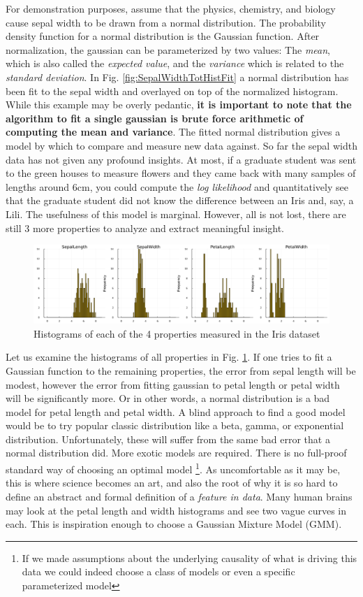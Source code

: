 For demonstration purposes, assume that the physics, chemistry, and biology cause sepal width to be drawn from a normal distribution. The probability density function for a normal distribution is the Gaussian function. After normalization, the gaussian can be parameterized by two values: The \emph{mean}, which is also called the \emph{expected value}, and the \emph{variance} which is related to the \emph{standard deviation}. In Fig. \ref{fig:SepalWidthTotHistFit} a normal distribution has been fit to the sepal width and overlayed on top of the normalized histogram. While this example may be overly pedantic, \textbf{it is important to note that the algorithm to fit a single gaussian is brute force arithmetic of computing the mean and variance}. The fitted normal distribution gives a model by which to compare and measure new data against. So far the sepal width data has not given any profound insights. At most, if a graduate student was sent to the green houses to measure flowers and they came back with many samples of lengths around 6cm, you could compute the \emph{log likelihood} and quantitatively see that the graduate student did not know the difference between an Iris and, say, a Lili. The usefulness of this model is marginal. However, all is not lost, there are still 3 more properties to analyze and extract meaningful insight.
\begin{figure}[h]
\centering
    \includegraphics[width=1.0\textwidth]{Code/propHist4x1_tot.png}
    \caption{Histograms of each of the 4 properties measured in the Iris dataset }
    \label{fig:propHist4x1_tot}
\end{figure}
Let us examine the histograms of all properties in Fig. \ref{fig:propHist4x1_tot}. If one tries to fit a Gaussian function to the remaining properties, the error from sepal length will be modest, however the error from fitting gaussian to petal length or petal width will be significantly more. Or in other words, a normal distribution is a bad model for petal length and petal width. A blind approach to find a good model would be to try popular classic distribution like a beta, gamma, or exponential  distribution. Unfortunately, these will suffer from the same bad error that a normal distribution did. More exotic models are required. There is no full-proof standard way of choosing an optimal model \footnote{If we made assumptions about the underlying causality of what is driving this data we could indeed choose a class of models or even a specific parameterized model}. As uncomfortable as it may be, this is where science becomes an art, and also the root of why it is so hard to define an abstract and formal definition of a \emph{feature in data}. Many human brains may look at the petal length and width histograms and see two vague curves in each. This is inspiration enough to choose a Gaussian Mixture Model (GMM). 


